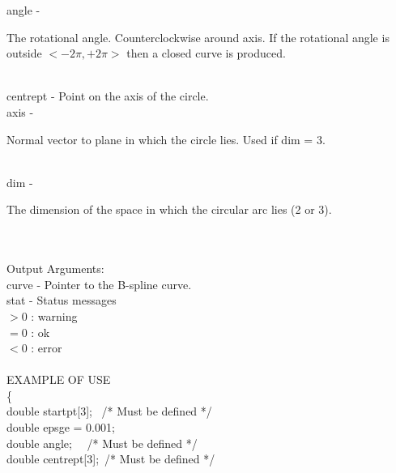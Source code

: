         \>\>    {\fov angle}    \> - \> \begin{minipg2}
                                The rotational angle. Counterclockwise around
                                axis. If the rotational angle
                                is outside $<-2\pi,+2\pi>$
                                then a closed curve is produced.
                                \end{minipg2}\\[0.3ex]
        \>\>    {\fov centrept}\> - \>  Point on the axis of the circle.\\
        \>\>    {\fov axis}     \> - \> \begin{minipg2}
                                Normal vector to plane in which the circle lies.
                                Used if dim = 3.
                                \end{minipg2}\\[0.8ex]
        \>\>    {\fov dim}      \> - \> \begin{minipg2}
                                The dimension of the space in which the
                                circular arc lies (2 or 3).
                                \end{minipg2}\\[0.3ex]
\\
\newpagetabs
        \>Output Arguments:\\
        \>\>    {\fov curve}    \> - \> Pointer to the B-spline curve.\\
        \>\>    {\fov stat}     \> - \> Status messages\\
                \>\>\>\>\>              $> 0$   : warning\\
                \>\>\>\>\>              $= 0$   : ok\\
                \>\>\>\>\>              $< 0$   : error\\
\\
EXAMPLE OF USE\\
                \>      \{ \\
                \>\>    double  \>      {\fov startpt}[3]; \, /* Must be defined */ \\
                \>\>    double  \>      {\fov epsge} = 0.001;\\
                \>\>    double  \>      {\fov angle}; \, \, /* Must be defined */ \\
                \>\>    double  \>      {\fov centrept}[3]; \,/* Must be defined */ \\
